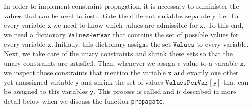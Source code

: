 In order to implement constraint propagation, it is necessary to administer the values that can be used
to instantiate the different variables separately, i.e.~for every variable $\texttt{x}$ we need to know which
values are admissible for $\texttt{x}$.  To this end, we need a dictionary $\texttt{ValuesPerVar}$ that
contains the set of possible values for every variable $\texttt{x}$.  Initially, this dictionary assigns the
set $\texttt{Values}$ to every variable.  Next, we take care of the unary constraints and shrink these sets so
that the unary constraints are satisfied.  Then, whenever we assign a value to a variable $\texttt{x}$,  we
inspect those constraints that mention the variable $\texttt{x}$ and exactly one other yet unassigned variable
$\texttt{y}$ and shrink the set of values $\texttt{ValuesPerVar}[\texttt{y}]$ that can be assigned to this
variables $\texttt{y}$.  This process is called  and is described in more detail
below when we discuss the function \texttt{propagate}.
